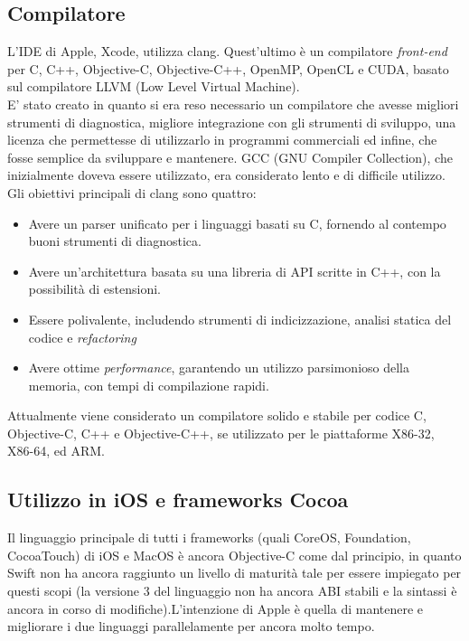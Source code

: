 \subsection{Compilatore}
L'IDE di Apple, Xcode, utilizza clang. Quest'ultimo è un compilatore \textit{front-end} per C, C++, Objective-C, Objective-C++, OpenMP, OpenCL e CUDA, basato sul compilatore LLVM (Low Level Virtual Machine).\\E' stato creato in quanto si era reso necessario un compilatore che avesse migliori strumenti di diagnostica, migliore integrazione con gli strumenti di sviluppo, una licenza che permettesse di utilizzarlo in programmi commerciali ed infine, che fosse semplice da sviluppare e mantenere. GCC (GNU Compiler Collection), che inizialmente doveva essere utilizzato, era considerato lento e di difficile utilizzo.\\Gli obiettivi principali di clang sono quattro:
\begin{itemize} 
\item Avere un parser unificato per i linguaggi basati su C, fornendo al contempo buoni strumenti di diagnostica.
\item Avere un'architettura basata su una libreria di API scritte in C++, con la possibilità di estensioni.
\item Essere polivalente, includendo strumenti di indicizzazione, analisi statica del codice e \textit{refactoring}
\item Avere ottime \textit{performance}, garantendo un utilizzo parsimonioso della memoria, con tempi di compilazione rapidi.
\end{itemize}
Attualmente viene considerato un compilatore solido e stabile per codice C, Objective-C, C++ e Objective-C++, se utilizzato per le piattaforme X86-32, X86-64, ed ARM.  
\subsection{Utilizzo in iOS e frameworks Cocoa}
Il linguaggio principale di tutti i frameworks (quali CoreOS, Foundation, CocoaTouch) di iOS e MacOS è ancora Objective-C come dal principio, in quanto Swift non ha ancora raggiunto un livello di maturità tale per essere impiegato per questi scopi (la versione 3 del linguaggio non ha ancora ABI stabili e la sintassi è ancora in corso di modifiche).L'intenzione di Apple è quella di mantenere e migliorare i due linguaggi parallelamente per ancora molto tempo.